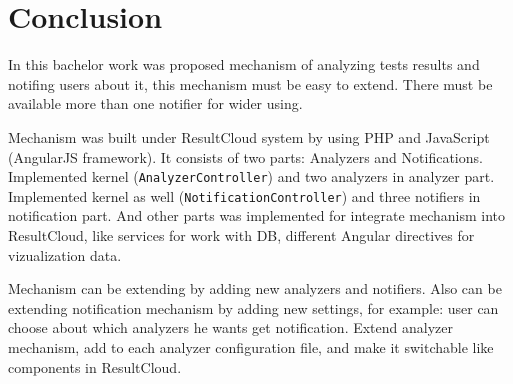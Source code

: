 \chapter{Conclusion}
\label{ch:conclusion}

In this bachelor work was proposed mechanism of analyzing tests results and notifing users about it, this mechanism must be easy to extend. There must be available more than one notifier for wider using.

Mechanism was built under ResultCloud system by using PHP and JavaScript (AngularJS framework). It consists of two parts: Analyzers and Notifications. Implemented kernel (\texttt{AnalyzerController}) and two analyzers in analyzer part. Implemented kernel as well (\texttt{NotificationController}) and three notifiers in notification part. And other parts was implemented for integrate mechanism into ResultCloud, like services for work with DB, different Angular directives for vizualization data.

Mechanism can be extending by adding new analyzers and notifiers. Also can be extending notification mechanism by adding new settings, for example: user can choose about which analyzers he wants get notification. Extend analyzer mechanism, add to each analyzer configuration file, and make it switchable like components in ResultCloud.


